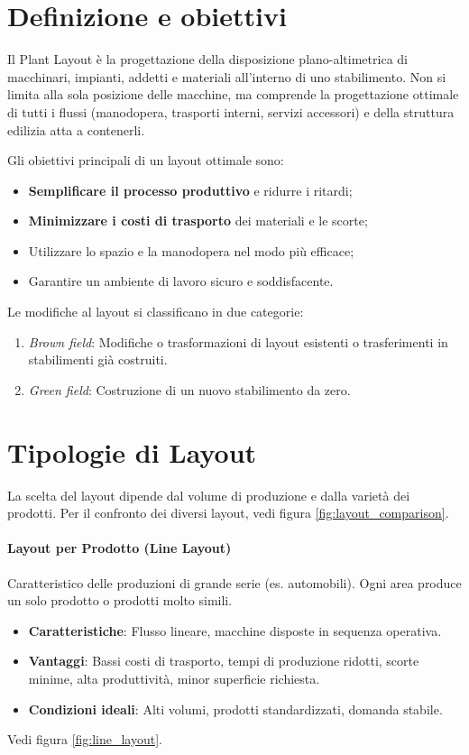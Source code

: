 %
%
\section{Definizione e obiettivi}
Il Plant Layout è la progettazione della disposizione plano-altimetrica di macchinari, impianti, addetti e materiali all'interno di uno stabilimento. Non si limita alla sola posizione delle macchine, ma comprende la progettazione ottimale di tutti i flussi (manodopera, trasporti interni, servizi accessori) e della struttura edilizia atta a contenerli.

Gli obiettivi principali di un layout ottimale sono:
\begin{itemize}
    \item \textbf{Semplificare il processo produttivo} e ridurre i ritardi;
    \item \textbf{Minimizzare i costi di trasporto} dei materiali e le scorte;
    \item Utilizzare lo spazio e la manodopera nel modo più efficace;
    \item Garantire un ambiente di lavoro sicuro e soddisfacente.
\end{itemize}
Le modifiche al layout si classificano in due categorie:
\begin{enumerate}
    \item \emph{Brown field}: Modifiche o trasformazioni di layout esistenti o trasferimenti in stabilimenti già costruiti.
    \item \emph{Green field}: Costruzione di un nuovo stabilimento da zero.
\end{enumerate}

%
\section{Tipologie di Layout}
La scelta del layout dipende dal volume di produzione e dalla varietà dei prodotti.
Per il confronto dei diversi layout, vedi figura \ref{fig:layout_comparison}.
%
\paragraph{Layout per Prodotto (Line Layout)} Caratteristico delle produzioni di grande serie (es. automobili). Ogni area produce un solo prodotto o prodotti molto simili.
\begin{itemize}
    \item \textbf{Caratteristiche}: Flusso lineare, macchine disposte in sequenza operativa.
    \item \textbf{Vantaggi}: Bassi costi di trasporto, tempi di produzione ridotti, scorte minime, alta produttività, minor superficie richiesta.
    \item \textbf{Condizioni ideali}: Alti volumi, prodotti standardizzati, domanda stabile.
\end{itemize}
Vedi figura \ref{fig:line_layout}.

